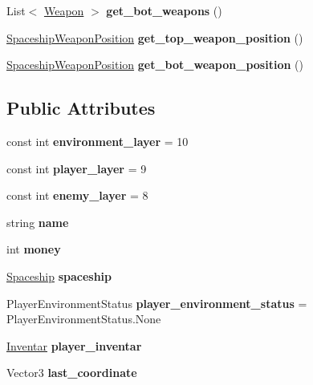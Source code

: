 \begin{DoxyCompactItemize}
List$<$ \hyperlink{class_weapon}{Weapon} $>$ {\bfseries get\+\_\+bot\+\_\+weapons} ()
\item 
\mbox{\label{class_player_a8708e99901002a2e5fe9e4b0a32459f5}} 
\hyperlink{class_spaceship_weapon_position}{Spaceship\+Weapon\+Position} {\bfseries get\+\_\+top\+\_\+weapon\+\_\+position} ()
\item 
\mbox{\label{class_player_afb7246586bfac930d9c026f0ce4d82f4}} 
\hyperlink{class_spaceship_weapon_position}{Spaceship\+Weapon\+Position} {\bfseries get\+\_\+bot\+\_\+weapon\+\_\+position} ()
\end{DoxyCompactItemize}
\subsection*{Public Attributes}
\begin{DoxyCompactItemize}
\item 
\mbox{\label{class_player_ad4c2ab5c71c359ab76459daa397c4614}} 
const int {\bfseries environment\+\_\+layer} = 10
\item 
\mbox{\label{class_player_af674941521cbd725210217e204ad7a99}} 
const int {\bfseries player\+\_\+layer} = 9
\item 
\mbox{\label{class_player_a5a5b105285ae9d74073d58dd8dc94fb5}} 
const int {\bfseries enemy\+\_\+layer} = 8
\item 
\mbox{\label{class_player_ac8bcb50bf826874dfa2d162af367d013}} 
string {\bfseries name}
\item 
\mbox{\label{class_player_aed37167e4117c2518a154e73fbfc103c}} 
int {\bfseries money}
\item 
\mbox{\label{class_player_a0e958a88a824f08873837fcf7d22344b}} 
\hyperlink{class_spaceship}{Spaceship} {\bfseries spaceship}
\item 
\mbox{\label{class_player_a27e922aea5e6371a33c0fa97e10413cd}} 
Player\+Environment\+Status {\bfseries player\+\_\+environment\+\_\+status} = Player\+Environment\+Status.\+None
\item 
\mbox{\label{class_player_a333843d71092ceb812d2f2715e6a20fa}} 
\hyperlink{class_inventar}{Inventar} {\bfseries player\+\_\+inventar}
\item 
\mbox{\label{class_player_a8cd10622dac298adaa763e6ae853e9a5}} 
Vector3 {\bfseries last\+\_\+coordinate}
\end{DoxyCompactItemize}
